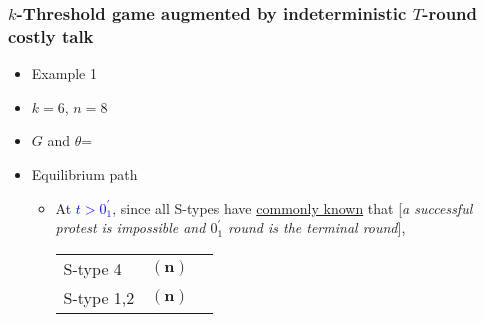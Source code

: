 \documentclass[9pt]{beamer}
\begin{document}
\begin{frame}
  \frametitle{$k$-Threshold game augmented by indeterministic $T$-round costly talk}

\begin{itemize}
\item Example 1
\item $k=6$, $n=8$
\item $G$ and $\theta$=
\begin{center}
\end{center}
\end{itemize}

\begin{itemize}
\item Equilibrium path
\begin{itemize}
\item 
{
At \textcolor{blue}{$t>0^{'}_1$}, since all S-types have \underline{commonly known} that \alert{[}\textit{a successful protest is impossible and $0^{'}_1$ round is the terminal round}\alert{]},
\begin{table}[h]
\begin{tabular}{ll l}
S-type 4 & $({\textbf{n}})$\\
S-type 1,2 & $({\textbf{n}})$
\end{tabular}
\end{table}
}

\end{itemize}
\end{itemize}

\end{frame}
\end{document}
